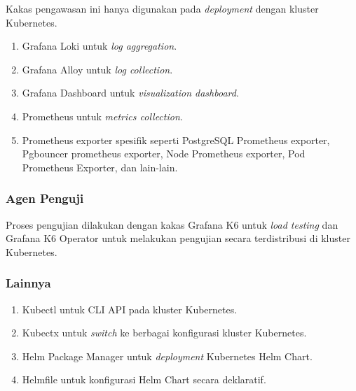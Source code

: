 Kakas pengawasan ini hanya digunakan pada \textit{deployment} dengan kluster Kubernetes.

\begin{enumerate}
    \item Grafana Loki untuk \textit{log aggregation}.
    \item Grafana Alloy untuk \textit{log collection}.
    \item Grafana Dashboard untuk \textit{visualization dashboard}.
    \item Prometheus untuk \textit{metrics collection}.
    \item Prometheus exporter spesifik seperti PostgreSQL Prometheus exporter, Pgbouncer prometheus exporter, Node Prometheus exporter, Pod Prometheus Exporter, dan lain-lain.
\end{enumerate}

\subsubsection{Agen Penguji}

Proses pengujian dilakukan dengan kakas Grafana K6 untuk \textit{load testing} dan Grafana K6 Operator untuk melakukan pengujian secara terdistribusi di kluster Kubernetes.

\subsubsection{Lainnya}

\begin{enumerate}
    \item Kubectl untuk CLI API pada kluster Kubernetes.
    \item Kubectx untuk \textit{switch} ke berbagai konfigurasi kluster Kubernetes.
    \item Helm Package Manager untuk \textit{deployment} Kubernetes Helm Chart.
    \item Helmfile untuk konfigurasi Helm Chart secara deklaratif.
\end{enumerate}